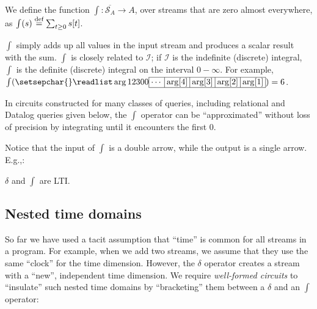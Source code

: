 \documentclass[twocolumn
]{svjour3}
\numberwithin{equation}{section}
\newcommand{\streamf}[1]{\ensuremath{\overline{\mathcal{S}_{#1}}}}
\newcommand{\I}{\mathcal{I}}  %
\newcommand{\I}{\mathit{I}}  %
\newcommand{\id}{\ensuremath{\mathit{id}}} %
\newcommand{\defn}{\stackrel{\textrm{\scriptsize def}}{=}}
\newcommand{\sv}[1]{ %
\setsepchar{ }
\readlist\arg{#1}
\setlength\tabcolsep{4pt}
\begin{tabular}{|c|c|c|c|c|} \hline
  \!\ensuremath{\cdots}\! &
  \!\ensuremath{\arg[4]}\! &
  \!\ensuremath{\arg[3]}\! &
  \!\ensuremath{\arg[2]}\! &
  \!\ensuremath{\arg[1]}\!
  \\ \hline
\end{tabular}
}
\begin{document}
\begin{definition}
We define the function $\int : \streamf{A} \rightarrow A$, over
streams that are zero almost everywhere, as $\int(s) \defn \sum_{t
  \geq 0} s[t]$.
\end{definition}

$\int$ simply adds up all values in the input stream
and produces a scalar result with the sum.  $\int$ is closely related
to $\I$; if $\I$ is the indefinite (discrete) integral, $\int$ is the
definite (discrete) integral on the interval $0 - \infty$.  For
example, $\int(\sv{1 2 3 0 0}) = 6$.

In circuits constructed for many classes of queries, including
relational and Datalog queries given below, the $\int$ operator can be
``approximated'' without loss of precision by integrating until it
encounters the first 0.

Notice that the input of $\int$ is a double arrow, while the output is
a single arrow.  E.g.,:

\begin{center}
\end{center}

\begin{proposition}
$\delta$ and $\int$ are LTI.
\end{proposition}

\vspace{-3ex}
\subsection{Nested time domains}

So far we have used a tacit assumption that ``time'' is common for all
streams in a program.  For example, when we add two streams, we assume
that they use the same ``clock'' for the time dimension.  However, the
$\delta$ operator creates a stream with a ``new'', independent time
dimension.  We require \emph{well-formed circuits} to ``insulate''
such nested time domains by ``bracketing'' them between a $\delta$ and
an $\int$ operator:
\end{document}
